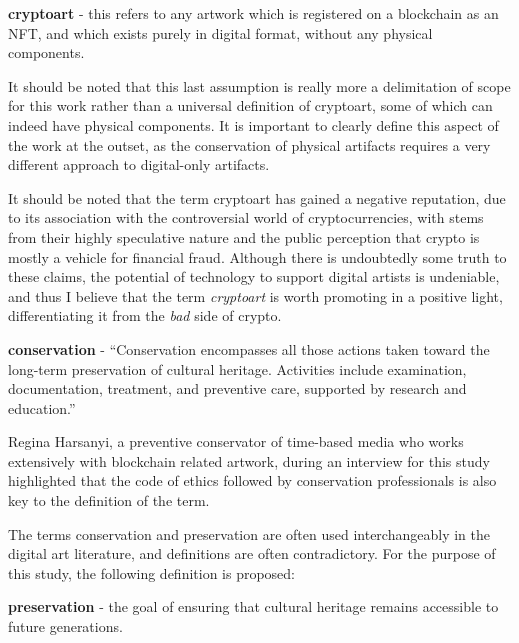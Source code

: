 \vspace{0.5cm}

\textbf{cryptoart} - this refers to any artwork which is registered on a blockchain as an NFT, and which exists purely in digital format, without any physical components.

It should be noted that this last assumption is really more a delimitation of scope for this work rather than a universal definition of cryptoart, some of which can indeed have physical components. It is important to clearly define this aspect of the work at the outset, as the conservation of physical artifacts requires a very different approach to digital-only artifacts.

\vspace{0.5cm}

It should be noted that the term cryptoart has gained a negative reputation, due to its association with the controversial world of cryptocurrencies, with stems from their highly speculative nature and the public perception that crypto is mostly a vehicle for financial fraud. Although there is undoubtedly some truth to these claims, the potential of technology to support digital artists is undeniable, and thus I believe that the term \emph{cryptoart} is worth promoting in a positive light, differentiating it from the \emph{bad} side of crypto.

\vspace{0.5cm}

\textbf{conservation} - ``Conservation encompasses all those actions taken toward the long-term preservation of cultural heritage. Activities include examination, documentation, treatment, and preventive care, supported by research and education.''  \cite{WhatConservation}

Regina Harsanyi, a preventive conservator of time-based media who works extensively with blockchain related artwork, during an interview for this study highlighted that the code of ethics followed by conservation professionals is also key to the definition of the term.

\vspace{0.5cm}

The terms conservation and preservation are often used interchangeably in the digital art literature, and definitions are often contradictory. For the purpose of this study, the following definition is proposed:

\vspace{0.5cm}
\textbf{preservation} - the goal of ensuring that cultural heritage remains accessible to future generations.

